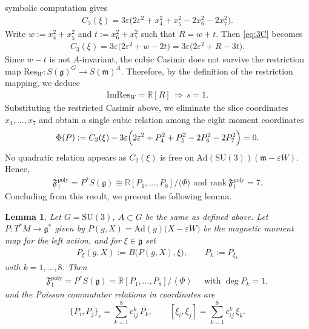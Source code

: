 \documentclass[11pt]{amsart}
\newtheorem{lemma}[theorem]{Lemma}
\theoremstyle{definition}
\theoremstyle{plain}
\theoremstyle{conclusion}
\begin{document}
symbolic computation gives\begin{align}
    C_3(\xi)=3\varepsilon \bigl(2\varepsilon^2+x_4^2+x_5^2-2x_6^2-2x_7^2\bigr).  \label{eq:3C}
\end{align} Write $w:=x_4^2+x_5^2 $ and $t:=x_6^2+x_7^2$ such that $R=w+t$. Then \eqref{eq:3C} becomes \begin{align}
C_3(\xi)=3\varepsilon\bigl(2\varepsilon^2+w-2t\bigr)
=3\varepsilon\bigl(2\varepsilon^2 +R - 3t\bigr).
\end{align} Since $w-t$ is not $A$-invariant, the cubic Casimir does not survive the restriction map $\mathrm{Res}_W:S(\mathfrak{g})^G\rightarrow S(\mathfrak{m})^A$. Therefore, by the definition of the restriction mapping, we deduce  \begin{align*}
\mathrm{Im}\mathrm{Res}_W=\mathbb{R}[R]\, \Longrightarrow \, s=1  .
\end{align*}   Substituting the restricted Casimir above, we eliminate the slice coordinates $x_4,\ldots,x_7$ and obtain a single cubic relation among the eight moment coordinates  \begin{align*}
      \Phi(P):= C_3(\xi) - 3\varepsilon \Bigl(2\varepsilon^2 + P_4^2+P_5^2-2P_6^2-2P_7^2\Bigr) = 0.
  \end{align*}  No quadratic relation appears as $C_2(\xi)$ is free on $\mathrm{Ad}(\mathrm{SU}(3))(\mathfrak{m} - \varepsilon W)$. Hence, \begin{align*}
      \mathfrak{F}_1^{\mathrm{poly}}  =P^*S(\mathfrak{g})   \cong\mathbb{R}[P_1,\ldots  ,P_8]\big/ \langle\Phi\rangle \text{ and } \mathrm{rank}\,\mathfrak{F}_1^{\mathrm{poly}}=7 .
  \end{align*} Concluding from this result, we present the following lemma. 
 
 \begin{lemma}
 \label{lem:F1poly2}
Let $G=\mathrm{SU}(3)$, $A\subset G$ be the same as defined above. Let  $P:T^*M\rightarrow\mathfrak{g}^*$ given by $P (g,X)=\mathrm{Ad}(g)\bigl(X-\varepsilon W\bigr)$ be the magnetic moment map for the left action, and for $\xi\in\mathfrak{g}$ set\begin{align*}
P_{\xi}(g,X):=B\bigl(P(g,X),\xi\bigr),\qquad P_k:= P_{\xi_k} 
\end{align*} with $k=1,\dots,8$.   Then\begin{align*}
\mathfrak{F}_1^{\mathrm{poly}}=P^*S(\mathfrak{g})=\mathbb{R}[P_1,\dots,P_8]\big/\left\langle \Phi\right\rangle \quad \text{ with } \deg P_k=1,
\end{align*} and the Poisson commutator relations in coordinates are \begin{equation}
\{P_i,P_j\}_\varepsilon = \sum_{k=1}^8 c_{ij}^k\,P_k,\qquad [\xi_i,\xi_j]=\sum_{k=1}^8 c_{ij}^k\,\xi_k. \label{eq:f1postr}
\end{equation}
\end{lemma}
\end{document}
